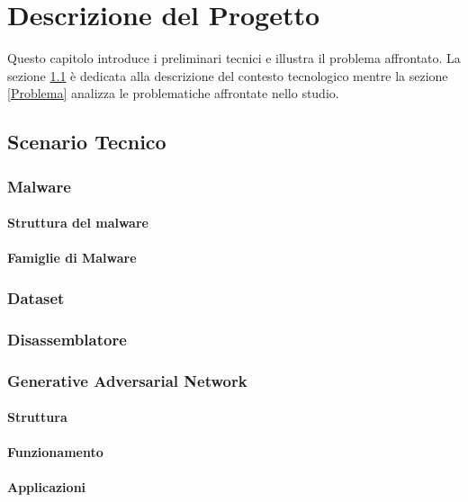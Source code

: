 \chapter{Descrizione del Progetto}
\label{cap:descrizione}

Questo capitolo introduce i preliminari tecnici e illustra il problema affrontato. La sezione \ref{Scenario} è dedicata alla descrizione del contesto tecnologico mentre la sezione \ref{Problema} analizza le problematiche affrontate nello studio. 

\section{Scenario Tecnico}
\label{Scenario}

\subsection{Malware}
\subsubsection{Struttura del malware}
\subsubsection{Famiglie di Malware}

\subsection{Dataset}

\subsection{Disassemblatore}


\subsection{Generative Adversarial Network}
\subsubsection{Struttura}
\subsubsection{Funzionamento}
\subsubsection{Applicazioni}
